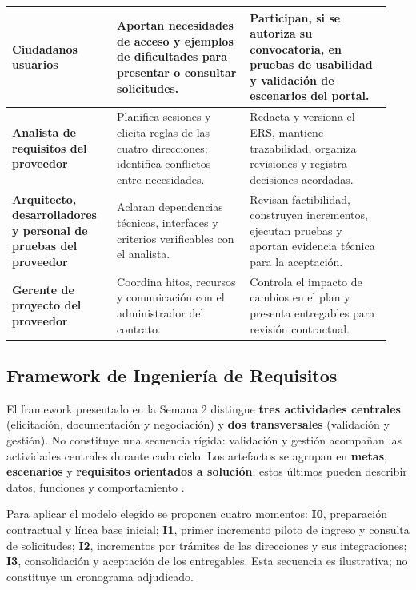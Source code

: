 \documentclass[conference,onecolumn]{IEEEtran}
\begin{document}
\begin{longtable}{@{}p{0.26\linewidth}p{0.33\linewidth}p{0.35\linewidth}@{}}
\midrule
\textbf{Ciudadanos usuarios} & Aportan necesidades de acceso y ejemplos de dificultades para presentar o consultar solicitudes. & Participan, si se autoriza su convocatoria, en pruebas de usabilidad y validación de escenarios del portal.\\
\midrule
\textbf{Analista de requisitos del proveedor} & Planifica sesiones y elicita reglas de las cuatro direcciones; identifica conflictos entre necesidades. & Redacta y versiona el ERS, mantiene trazabilidad, organiza revisiones y registra decisiones acordadas.\\
\midrule
\textbf{Arquitecto, desarrolladores y personal de pruebas del proveedor} & Aclaran dependencias técnicas, interfaces y criterios verificables con el analista. & Revisan factibilidad, construyen incrementos, ejecutan pruebas y aportan evidencia técnica para la aceptación.\\
\midrule
\textbf{Gerente de proyecto del proveedor} & Coordina hitos, recursos y comunicación con el administrador del contrato. & Controla el impacto de cambios en el plan y presenta entregables para revisión contractual.\\
\end{longtable}

\subsection{Framework de Ingeniería de Requisitos}

El framework presentado en la Semana 2 distingue \textbf{tres actividades centrales} (elicitación, documentación y negociación) y \textbf{dos transversales} (validación y gestión). No constituye una secuencia rígida: validación y gestión acompañan las actividades centrales durante cada ciclo. Los artefactos se agrupan en \textbf{metas}, \textbf{escenarios} y \textbf{requisitos orientados a solución}; estos últimos pueden describir datos, funciones y comportamiento \cite{pohl2025,buhne2026}.

Para aplicar el modelo elegido se proponen cuatro momentos: \textbf{I0}, preparación contractual y línea base inicial; \textbf{I1}, primer incremento piloto de ingreso y consulta de solicitudes; \textbf{I2}, incrementos por trámites de las direcciones y sus integraciones; \textbf{I3}, consolidación y aceptación de los entregables. Esta secuencia es ilustrativa; no constituye un cronograma adjudicado.
\end{document}
